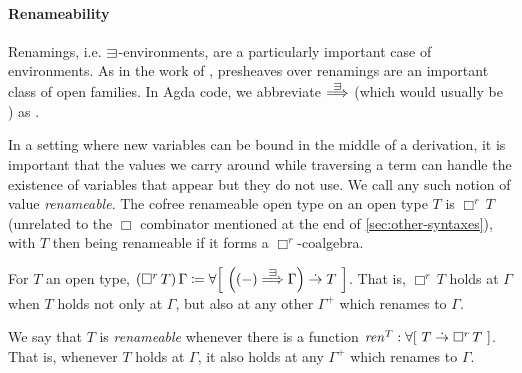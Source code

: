 
\paragraph{Renameability}
Renamings, i.e. $\sqni$-environments, are a particularly important case of
environments.
As in the work of \citet{FPT99}, presheaves over renamings are an important
class of open families.
In Agda code, we abbreviate $\env\sqni$ (which would usually be
\AgdaOperator{\AgdaRecord{[}}\AgdaSpace{}%
\AgdaOperator{\AgdaRecord{\AgdaUnderscore{}$\sqni$\AgdaUnderscore{}}}\AgdaSpace{}%
\AgdaOperator{\AgdaRecord{]\AgdaUnderscore{}$\Rightarrow^e$\AgdaUnderscore{}}}%
) as .


In a setting where new variables can be bound in the middle of a derivation,
it is important that the values we carry around while traversing a term can
handle the existence of variables that appear but they do not use.
We call any such notion of value \emph{renameable}.
The cofree renameable open type on an open type $T$ is $\Box^r\,T$ (unrelated to
the $\Box$ combinator mentioned at the end of \cref{sec:other-syntaxes}), with
$T$ then being renameable if it forms a $\Box^r$-coalgebra.

\begin{definition}\label{def:box-r}
  For $T$ an open type,
  $\plr{\Box^r\,T}\,\Gamma \coloneqq
    \forallb{\plr{\plr{-} \env{\sqni} \Gamma} \dotto T}$.
  That is, $\Box^r\,T$ holds at $\Gamma$ when $T$ holds not only at $\Gamma$,
  but also at any other $\Gamma^+$ which renames to $\Gamma$.
\end{definition}
\begin{definition}\label{def:renameable}
  We say that $T$ is \emph{renameable} whenever there is a function
  $\mathit{ren}^T : \forallb{T \dotto \Box^r\,T}$.
  That is, whenever $T$ holds at $\Gamma$, it also holds at any $\Gamma^+$ which
  renames to $\Gamma$.
\end{definition}


